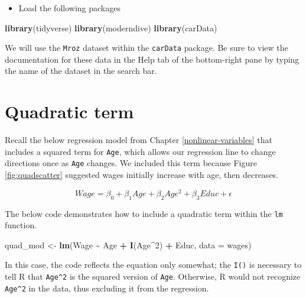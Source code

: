 \documentclass[
]{book}
\makeatletter
\newenvironment{Shaded}{\begin{snugshade}}{\end{snugshade}}
\newcommand{\AttributeTok}[1]{\textcolor[rgb]{0.27,0.27,0.27}{#1}}
\newcommand{\DecValTok}[1]{\textcolor[rgb]{0.06,0.06,0.06}{#1}}
\newcommand{\FunctionTok}[1]{\textcolor[rgb]{0.27,0.27,0.27}{\textbf{#1}}}
\newcommand{\NormalTok}[1]{#1}
\newcommand{\OtherTok}[1]{\textcolor[rgb]{0.37,0.37,0.37}{#1}}
\newcommand{\SpecialCharTok}[1]{\textcolor[rgb]{0.43,0.43,0.43}{\textbf{#1}}}
\providecommand{\tightlist}{%
  \setlength{\itemsep}{0pt}\setlength{\parskip}{0pt}}
\newenvironment{kframe}{%
\medskip{}
\setlength{\fboxsep}{.8em}
 \def\at@end@of@kframe{}%
 \ifinner\ifhmode%
  \def\at@end@of@kframe{\end{minipage}}%
  \begin{minipage}{\columnwidth}%
 \fi\fi%
 \def\FrameCommand##1{\hskip\@totalleftmargin \hskip-\fboxsep
 \colorbox{shadecolor}{##1}\hskip-\fboxsep
     \hskip-\linewidth \hskip-\@totalleftmargin \hskip\columnwidth}%
 \MakeFramed {\advance\hsize-\width
   \@totalleftmargin\z@ \linewidth\hsize
   \@setminipage}}%
 {\par\unskip\endMakeFramed%
 \at@end@of@kframe}
\renewenvironment{Shaded}{\begin{kframe}}{\end{kframe}}
\makeatother
\begin{document}
\begin{itemize}
\tightlist
\item
  Load the following packages
\end{itemize}

\begin{Shaded}
\begin{Highlighting}[]
\FunctionTok{library}\NormalTok{(tidyverse)}
\FunctionTok{library}\NormalTok{(moderndive)}
\FunctionTok{library}\NormalTok{(carData)}
\end{Highlighting}
\end{Shaded}

We will use the \texttt{Mroz} dataset within the \texttt{carData} package. Be sure to view the documentation for these data in the Help tab of the bottom-right pane by typing the name of the dataset in the search bar.

\hypertarget{quadratic-term}{%
\section{Quadratic term}\label{quadratic-term}}

Recall the below regression model from Chapter \ref{nonlinear-variables} that includes a squared term for \texttt{Age}, which allows our regression line to change directions once as \texttt{Age} changes. We included this term because Figure \ref{fig:quadscatter} suggested wages initially increase with age, then decreases.

\begin{equation}
Wage = \beta_0 + \beta_1Age + \beta_2Age^2 + \beta_3Educ + \epsilon
\end{equation}

The below code demonstrates how to include a quadratic term within the \texttt{lm} function.

\begin{Shaded}
\begin{Highlighting}[]
\NormalTok{quad\_mod }\OtherTok{\textless{}{-}} \FunctionTok{lm}\NormalTok{(Wage }\SpecialCharTok{\textasciitilde{}}\NormalTok{ Age }\SpecialCharTok{+} \FunctionTok{I}\NormalTok{(Age}\SpecialCharTok{\^{}}\DecValTok{2}\NormalTok{) }\SpecialCharTok{+}\NormalTok{ Educ, }\AttributeTok{data =}\NormalTok{ wages)}
\end{Highlighting}
\end{Shaded}

In this case, the code reflects the equation only somewhat; the \texttt{I()} is necessary to tell R that \texttt{Age\^{}2} is the squared version of \texttt{Age}. Otherwise, R would not recognize \texttt{Age\^{}2} in the data, thus excluding it from the regression.
\end{document}
